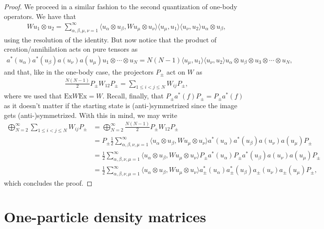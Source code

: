 \begin{proof}
	We proceed in a similar fashion to the second quantization of one-body operators. We have
	that
	\begin{align*}
		Wu_1\otimes u_2 = \sum_{\alpha,\beta,\mu,\nu=1}^\infty
		\langle u_\alpha\otimes u_\beta,Wu_\mu\otimes u_\nu\rangle
		\langle u_\mu,u_1\rangle\langle u_\nu,u_2\rangle u_\alpha\otimes u_\beta,
	\end{align*}
	using the resolution of the identity. But now notice that the product of
	creation/annihilation acts on pure tensors as
	\begin{align*}
		a^*(u_\alpha)a^*(u_\beta)a(u_\nu)a(u_\mu)u_1\otimes\cdots\otimes u_N =
		N(N-1)\langle u_\mu,u_1\rangle\langle u_\nu,u_2\rangle u_\alpha\otimes u_\beta\otimes u_3\otimes\cdots\otimes u_N,
	\end{align*}
	and that, like in the one-body case, the projectors $P_\pm$ act on $W$ as
	\begin{align*}
		\frac{N(N-1)}{2}P_\pm W_{12}P_\pm = \sum_{1\leq i<j\leq N} W_{ij}P_\pm,
	\end{align*}
	where we used that $\mathrm{Ex}W\mathrm{Ex}=W$. Recall, finally, that $P_\pm a^*(f)P_\pm=
	P_\pm a^*(f)$ as it doesn't matter if the starting state is (anti-)symmetrized since the
	image gets (anti-)symmetrized. With this in mind, we may write
	\begin{align*}
		\bigoplus_{N=2}^\infty \sum_{1\leq i<j\leq N} W_{ij}P_\pm
		&= \bigoplus_{N=2}^\infty \frac{N(N-1)}{2} P_\pm W_{12}P_\pm \\
		&= P_\pm\frac{1}{2}\sum_{\alpha,\beta,\nu,\mu=1}^\infty
		\langle u_\alpha\otimes u_\beta, W u_\mu\otimes u_\nu \rangle
		a^*(u_\alpha)a^*(u_\beta)a(u_\nu)a(u_\mu)P_\pm\\
		&= \frac{1}{2}\sum_{\alpha,\beta,\nu,\mu=1}^\infty
		\langle u_\alpha\otimes u_\beta, W u_\mu\otimes u_\nu \rangle
		P_\pm a^*(u_\alpha)P_\pm a^*(u_\beta)a(u_\nu)a(u_\mu)P_\pm\\
		&= \frac{1}{2}\sum_{\alpha,\beta,\nu,\mu=1}^\infty
		\langle u_\alpha\otimes u_\beta, W u_\mu\otimes u_\nu \rangle
		a^*_\pm(u_\alpha)a^*_\pm(u_\beta)a_\pm(u_\nu)a_\pm(u_\mu)P_\pm,
	\end{align*}
	which concludes the proof.
\end{proof}

\section{One-particle density matrices}

